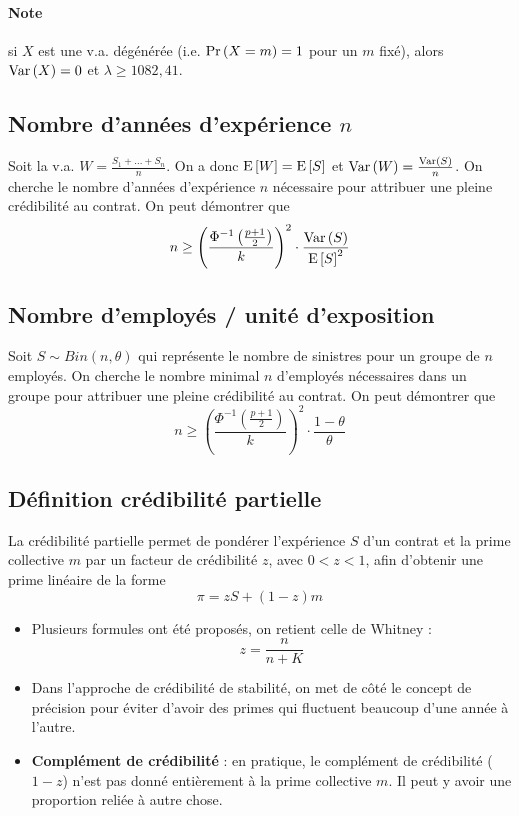 \documentclass[10pt, french]{article}
\begin{document}
\begin{multicols*}{3}
\paragraph{Note} si $X$ est une v.a. dégénérée (i.e. $\Pr \left( X = m \right) = 1$ pour un $m$ fixé), alors $\mathrm{Var} \left( X \right) = 0$ et $\lambda \geq 1082,41$.

\subsection*{Nombre d'années d'expérience $n$}
Soit la v.a. $W = \frac{S_1 + ... + S_n}{n}$. On a donc $\mathrm{E} \left[ W \right] = \mathrm{E} \left[ S \right]$ et $\mathrm{Var} \left( W \right) = \frac{\mathrm{Var} \left( S \right)}{n}$. On cherche le nombre d'années d'expérience $n$ nécessaire pour attribuer une pleine crédibilité au contrat. On peut démontrer que
\begin{equation}
n \geq \left( \frac{\Phi^{-1}\left(\frac{p+1}{2} \right)}{k} \right)^2 \cdot \frac{\mathrm{Var} \left( S \right)}{\mathrm{E} \left[ S \right]^2}
\end{equation}

\subsection*{Nombre d'employés / unité d'exposition}
Soit $S \sim Bin(n, \theta)$ qui représente le nombre de sinistres pour un groupe de $n$ employés. On cherche le nombre minimal $n$ d'employés nécessaires dans un groupe pour attribuer une pleine crédibilité au contrat. On peut démontrer que
\begin{equation}
n \geq \left( \frac{\Phi^{-1}\left(\frac{p+1}{2} \right)}{k} \right)^2 \cdot \frac{1 - \theta}{\theta}
\end{equation}

\subsection*{Définition crédibilité partielle}
\begin{definition}
La crédibilité partielle permet de pondérer l'expérience $S$ d'un contrat et la prime collective $m$ par un facteur de crédibilité $z$, avec $0 < z < 1$, afin d'obtenir une prime linéaire de la forme
\[\pi = z S + (1-z) m\]
\end{definition}
\begin{itemize}
\item Plusieurs formules ont été proposés, on retient celle de Whitney : 
\begin{equation}
z = \frac{n}{n+K}
\end{equation}
\item Dans l'approche de crédibilité de stabilité, on met de côté le concept de précision pour éviter d'avoir des primes qui fluctuent beaucoup d'une année à l'autre.
\item \textbf{Complément de crédibilité} : en pratique, le complément de crédibilité ($1-z$) n'est pas donné entièrement à la prime collective $m$. Il peut y avoir une proportion reliée à autre chose.
\end{itemize}


\end{multicols*}
\end{document}
